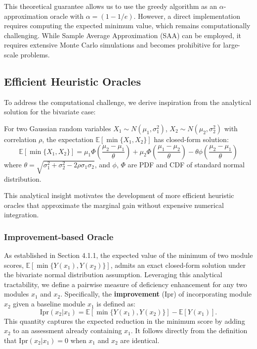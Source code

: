 \documentclass[opre,sglanonrev]{informs4}
\begin{document}
This theoretical guarantee allows us to use the greedy algorithm as an $\alpha$-approximation oracle with $\alpha = (1 - 1/e)$. However, a direct implementation requires computing the expected minimum value, which remains computationally challenging. While Sample Average Approximation (SAA) can be employed, it requires extensive Monte Carlo simulations and becomes prohibitive for large-scale problems.

\subsection{Efficient Heuristic Oracles}

To address the computational challenge, we derive inspiration from the analytical solution for the bivariate case:

\begin{lemma}
\label{lem:bivariate}
For two Gaussian random variables $X_1\sim N(\mu_1,\sigma^2_1)$, $X_2\sim N(\mu_2,\sigma^2_2)$ with correlation $\rho$, the expectation $\mathbb{E}[\min\{X_1, X_2\}]$ has closed-form solution:
$$
\mathbb{E}[\min\{X_1, X_2\}] = \mu_1\Phi(\frac{\mu_2-\mu_1}{\theta}) + \mu_2\Phi(\frac{\mu_1-\mu_2}{\theta}) - \theta \phi(\frac{\mu_2-\mu_1}{\theta} )
$$
where $\theta = \sqrt{\sigma^2_1+\sigma^2_2-2\rho \sigma_1\sigma_2}$, and $\phi$, $\Phi$ are PDF and CDF of standard normal distribution.
\end{lemma}

This analytical insight motivates the development of more efficient heuristic oracles that approximate the marginal gain without expensive numerical integration.

\subsubsection{Improvement-based Oracle}

As established in Section 4.1.1, the expected value of the minimum of two module scores, $\mathbb{E}[\min\{Y(x_1), Y(x_2)\}]$, admits an exact closed-form solution under the bivariate normal distribution assumption. Leveraging this analytical tractability, we define a pairwise measure of deficiency enhancement for any two modules $x_1$ and $x_2$. Specifically, the \textbf{improvement} (Ipr) of incorporating module $x_2$ given a baseline module $x_1$ is defined as:
$$
\text{Ipr}(x_2 | x_1) = \mathbb{E}[\min\{Y(x_1), Y(x_2)\}] - \mathbb{E}[Y(x_1)].
$$
This quantity captures the expected reduction in the minimum score by adding $x_2$ to an assessment already containing $x_1$. It follows directly from the definition that $\text{Ipr}(x_2 | x_1) = 0$ when $x_1$ and $x_2$ are identical.
\end{document}
